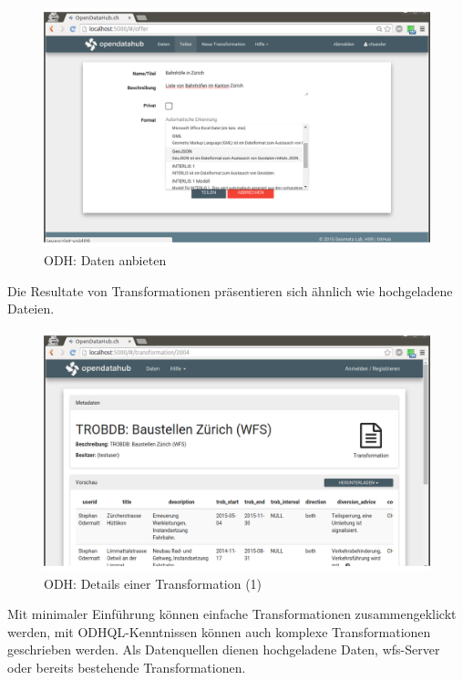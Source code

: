 \begin{figure}[H]
    \centering
    \includegraphics[width=2\linewidth/3]{fig/odh-offer-data}
    \caption{ODH: Daten anbieten}
\end{figure}

Die Resultate von Transformationen präsentieren sich ähnlich wie hochgeladene Dateien.

\begin{figure}[H]
    \centering
    \includegraphics[width=2\linewidth/3]{fig/odh-transformation-detail}
    \caption{ODH: Details einer Transformation (1)}
\end{figure}

Mit minimaler Einführung können einfache Transformationen zusammengeklickt werden, mit ODHQL-Kenntnissen können auch komplexe Transformationen geschrieben werden. Als Datenquellen dienen hochgeladene Daten, \acs{wfs}-Server oder bereits bestehende Transformationen.

